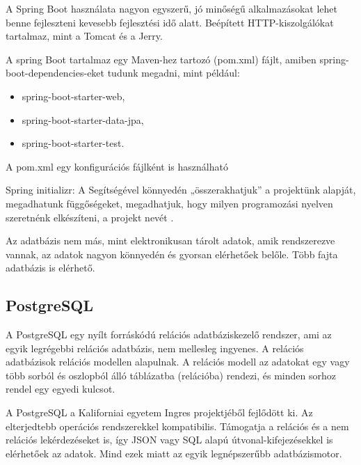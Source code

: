 A Spring Boot használata nagyon egyszerű, jó minőségű alkalmazásokat lehet benne fejleszteni kevesebb fejlesztési idő alatt. Beépített HTTP-kiszolgálókat tartalmaz, mint a Tomcat és a Jerry.

A spring Boot tartalmaz egy Maven-hez tartozó (pom.xml) fájlt, amiben spring-boot-dependencies-eket tudunk megadni, mint például:

\begin{itemize}
\item spring-boot-starter-web,
\item spring-boot-starter-data-jpa,
\item spring-boot-starter-test.
\end{itemize}

A pom.xml egy konfigurációs fájlként is használható

Spring initializr: A Segítségével könnyedén „összerakhatjuk” a projektünk alapját, megadhatunk függőségeket, megadhatjuk, hogy milyen programozási nyelven szeretnénk elkészíteni, a projekt nevét \cite{SpringBoot}.

Az adatbázis nem más, mint elektronikusan tárolt adatok, amik rendszerezve vannak, az adatok nagyon könnyedén és gyorsan elérhetőek belőle. Több fajta adatbázis is elérhető.


\subsection{PostgreSQL}

A PostgreSQL egy nyílt forráskódú relációs adatbáziskezelő rendszer, ami az egyik legrégebbi relációs adatbázis, nem mellesleg ingyenes. A relációs adatbázisok relációs modellen alapulnak. A relációs modell az adatokat egy vagy több sorból és oszlopból álló táblázatba (relációba) rendezi, és minden sorhoz rendel egy egyedi kulcsot.

A PostgreSQL a Kaliforniai egyetem Ingres projektjéből fejlődött ki. Az elterjedtebb operációs rendszerekkel kompatibilis. Támogatja a relációs és a nem relációs lekérdezéseket is, így JSON vagy SQL alapú útvonal-kifejezésekkel is elérhetőek az adatok.  Mind ezek miatt az egyik legnépszerűbb adatbázismotor.\cite{PostgreSQL}

